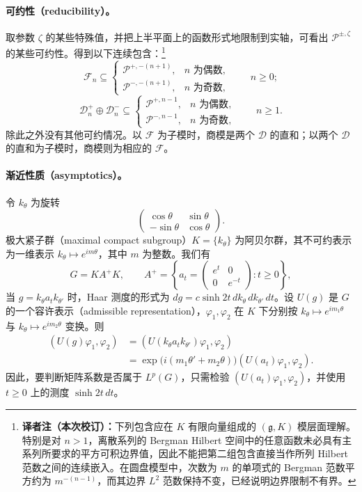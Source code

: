 \paragraph*{可约性（reducibility）。} 取参数 $\zeta$ 的某些特殊值，并把上半平面上的函数形式地限制到实轴，可看出 $\mathcal P^{\pm,\zeta}$ 的某些可约性。得到以下连续包含：\nobreak\footnote{\textbf{译者注（本次校订）：}下列包含应在 $K$ 有限向量组成的 $(\mathfrak g,K)$ 模层面理解。特别是对 $n>1$，离散系列的 Bergman Hilbert 空间中的任意函数未必具有主系列所要求的平方可积边界值，因此不能把第二组包含直接当作所列 Hilbert 范数之间的连续嵌入。在圆盘模型中，次数为 $m$ 的单项式的 Bergman 范数平方约为 $m^{-(n-1)}$，而其边界 $L^2$ 范数保持不变，已经说明边界限制不有界。}
\[
 \mathcal F_n\subseteq
 \begin{cases}
 \mathcal P^{+,-(n+1)},&n\text{ 为偶数},\\
 \mathcal P^{-,-(n+1)},&n\text{ 为奇数},
 \end{cases}\qquad n\ge0;
\]
\[
 \mathcal D_n^+\oplus\mathcal D_n^-\subseteq
 \begin{cases}
 \mathcal P^{+,n-1},&n\text{ 为偶数},\\
 \mathcal P^{-,n-1},&n\text{ 为奇数},
 \end{cases}\qquad n\ge1.
\]
除此之外没有其他可约情况。以 $\mathcal F$ 为子模时，商模是两个 $\mathcal D$ 的直和；以两个 $\mathcal D$ 的直和为子模时，商模则为相应的 $\mathcal F$。

\paragraph*{渐近性质（asymptotics）。} 令 $k_\theta$ 为旋转
\[
 \begin{pmatrix}\cos\theta&\sin\theta\\-\sin\theta&\cos\theta\end{pmatrix}.
\]
极大紧子群（maximal compact subgroup）$K=\{k_\theta\}$ 为阿贝尔群，其不可约表示为一维表示 $k_\theta\mapsto e^{im\theta}$，其中 $m$ 为整数。我们有
\[
 G=KA^+K,\qquad A^+=\left\{a_t=\begin{pmatrix}e^t&0\\0&e^{-t}\end{pmatrix}:t\ge0\right\},
\]
当 $g=k_\theta a_tk_{\theta'}$ 时，Haar 测度的形式为 $dg=c\sinh2t\,dk_\theta\,dk_{\theta'}\,dt$。设 $U(g)$ 是 $G$ 的一个容许表示（admissible representation），$\varphi_1,\varphi_2$ 在 $K$ 下分别按 $k_\theta\mapsto e^{im_1\theta}$ 与 $k_\theta\mapsto e^{im_2\theta}$ 变换。则
\[
 \begin{split}
 (U(g)\varphi_1,\varphi_2)
 &=(U(k_\theta a_tk_{\theta'})\varphi_1,\varphi_2)\\
 &=\exp\bigl(i(m_1\theta'+m_2\theta)\bigr)(U(a_t)\varphi_1,\varphi_2).
 \end{split}
\]
因此，要判断矩阵系数是否属于 $L^p(G)$，只需检验 $(U(a_t)\varphi_1,\varphi_2)$，并使用 $t\ge0$ 上的测度 $\sinh2t\,dt$。

